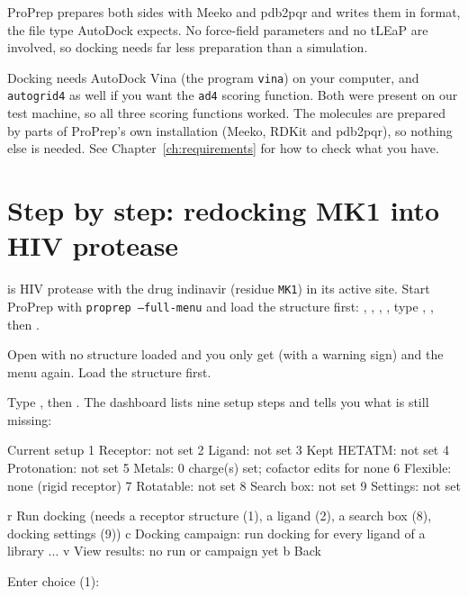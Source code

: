 \begin{behindscenes}
ProPrep prepares both sides with Meeko and pdb2pqr and writes them in
 format, the file type AutoDock expects. No force-field parameters
and no tLEaP are involved, so docking needs far less preparation than a
simulation.
\end{behindscenes}

\begin{needsoftware}
Docking needs AutoDock Vina (the program \texttt{vina}) on your computer, and
\texttt{autogrid4} as well if you want the \texttt{ad4} scoring function. Both
were present on our test machine, so all three scoring functions worked. The
molecules are prepared by parts of ProPrep's own installation (Meeko, RDKit
and pdb2pqr), so nothing else is needed. See
Chapter~\ref{ch:requirements} for how to check what you have.
\end{needsoftware}

\section{Step by step: redocking MK1 into HIV protease}
\label{sec:docking-steps}

 is HIV protease with the drug indinavir (residue \texttt{MK1}) in
its active site. Start ProPrep with \texttt{proprep --full-menu} and load the
structure first: , , , , type ,
, then .

\begin{tip}
Open  with no structure loaded and you only get
 (with a warning sign) and the menu again.
Load the structure
first.
\end{tip}

Type , then . The dashboard lists nine setup steps and tells
you what is still missing:

\begin{screen}
  Current setup
  1 Receptor:     not set
  2 Ligand:       not set
  3 Kept HETATM:  not set
  4 Protonation:  not set
  5 Metals:       0 charge(s) set; cofactor edits for none
  6 Flexible:     none (rigid receptor)
  7 Rotatable:    not set
  8 Search box:   not set
  9 Settings:     not set

  r Run docking  (needs a receptor structure (1), a ligand (2), a search
    box (8), docking settings (9))
  c Docking campaign: run docking for every ligand of a library ...
  v View results: no run or campaign yet
  b Back

Enter choice (1):
\end{screen}

